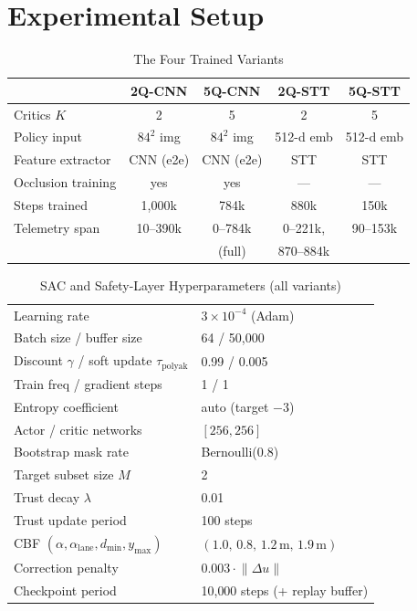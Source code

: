 \documentclass[conference]{IEEEtran}
\begin{document}
\section{Experimental Setup}
\begin{table}[htbp]
\centering
\caption{The Four Trained Variants}
\label{tab:variants}
\begin{tabular}{lcccc}
\toprule
 & \textbf{2Q-CNN} & \textbf{5Q-CNN} & \textbf{2Q-STT} & \textbf{5Q-STT} \\
\midrule
Critics $K$ & 2 & 5 & 2 & 5 \\
Policy input & $84^2$ img & $84^2$ img & 512-d emb & 512-d emb \\
Feature extractor & CNN (e2e) & CNN (e2e) & STT & STT \\
Occlusion training & yes & yes & --- & --- \\
Steps trained & 1{,}000k & 784k & 880k & 150k \\
Telemetry span & 10--390k & 0--784k & 0--221k, & 90--153k \\
 & & (full) & 870--884k & \\
\bottomrule
\end{tabular}
\end{table}

\begin{table}[htbp]
\centering
\caption{SAC and Safety-Layer Hyperparameters (all variants)}
\label{tab:hyper}
\begin{tabular}{ll}
\toprule
Learning rate & $3\times10^{-4}$ (Adam) \\
Batch size / buffer size & 64 / 50{,}000 \\
Discount $\gamma$ / soft update $\tau_{\mathrm{polyak}}$ & 0.99 / 0.005 \\
Train freq / gradient steps & 1 / 1 \\
Entropy coefficient & auto (target $-3$) \\
Actor / critic networks & $[256, 256]$ \\
Bootstrap mask rate & Bernoulli(0.8) \\
Target subset size $M$ & 2 \\
Trust decay $\lambda$ & 0.01 \\
Trust update period & 100 steps \\
CBF $(\alpha, \alpha_{\mathrm{lane}}, d_{\min}, y_{\max})$ & $(1.0,\, 0.8,\, 1.2\,\mathrm{m},\, 1.9\,\mathrm{m})$ \\
Correction penalty & $0.003 \cdot \lVert \Delta u \rVert$ \\
Checkpoint period & 10{,}000 steps (+ replay buffer) \\
\bottomrule
\end{tabular}
\end{table}
\end{document}
